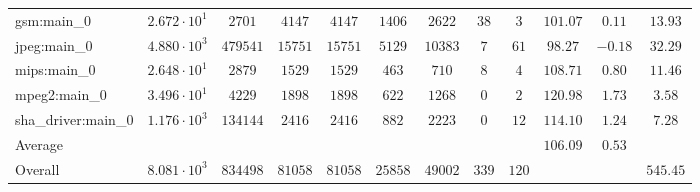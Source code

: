 \begin{tabular}{|l|c|c|c|c|c|c|c|c|c|c|c|}
gsm:main\_0             & $ 2.672 \cdot 10^{1} $ & $ 2701   $ & $ 4147  $ & $ 4147  $ & $ 1406  $ & $ 2622  $ & $ 38  $ & $ 3   $ & $ 101.07      $ & $ 0.11    $ & $ 13.93   $ \\
jpeg:main\_0            & $ 4.880 \cdot 10^{3} $ & $ 479541 $ & $ 15751 $ & $ 15751 $ & $ 5129  $ & $ 10383 $ & $ 7   $ & $ 61  $ & $ 98.27       $ & $ -0.18   $ & $ 32.29   $ \\
mips:main\_0            & $ 2.648 \cdot 10^{1} $ & $ 2879   $ & $ 1529  $ & $ 1529  $ & $ 463   $ & $ 710   $ & $ 8   $ & $ 4   $ & $ 108.71      $ & $ 0.80    $ & $ 11.46   $ \\
mpeg2:main\_0           & $ 3.496 \cdot 10^{1} $ & $ 4229   $ & $ 1898  $ & $ 1898  $ & $ 622   $ & $ 1268  $ & $ 0   $ & $ 2   $ & $ 120.98      $ & $ 1.73    $ & $ 3.58    $ \\
sha\_driver:main\_0     & $ 1.176 \cdot 10^{3} $ & $ 134144 $ & $ 2416  $ & $ 2416  $ & $ 882   $ & $ 2223  $ & $ 0   $ & $ 12  $ & $ 114.10      $ & $ 1.24    $ & $ 7.28    $ \\
\hline
Average                 & $                    $ & $        $ & $       $ & $       $ & $       $ & $       $ & $     $ & $     $ & $ 106.09      $ & $ 0.53    $ & $         $ \\
\hline
Overall                 & $ 8.081 \cdot 10^{3} $ & $ 834498 $ & $ 81058 $ & $ 81058 $ & $ 25858 $ & $ 49002 $ & $ 339 $ & $ 120 $ & $             $ & $         $ & $ 545.45  $ \\
\hline
\end{tabular}

